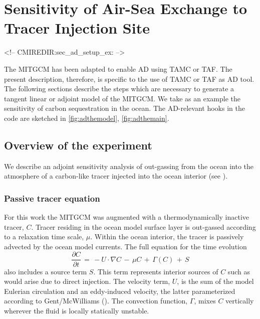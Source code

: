 
\section{Sensitivity of Air-Sea Exchange to Tracer Injection Site }
\label{www:tutorials}
\label{sect:eg-simple-tracer-adjoint}
\label{sec_ad_setup_ex}
\label{sect:tutorialIII}
\begin{rawhtml}
<!-- CMIREDIR:sec_ad_setup_ex: -->
\end{rawhtml}

The MITGCM has been adapted to enable AD using TAMC or TAF.
The present description, therefore, is specific to the
use of TAMC or TAF as AD tool.
The following sections describe the steps which are necessary to 
generate a tangent linear or adjoint model of the MITGCM.
We take as an example the sensitivity of carbon sequestration
in the ocean.
The AD-relevant hooks in the code are sketched in 
\ref{fig:adthemodel}, \ref{fig:adthemain}.

\subsection{Overview of the experiment}
\label{www:tutorials}

We describe an adjoint sensitivity analysis of out-gassing from 
the ocean into the atmosphere of a carbon-like tracer injected
into the ocean interior (see \cite{hil-eta:01}).

\subsubsection{Passive tracer equation}
\label{www:tutorials}

For this work the MITGCM was augmented with a thermodynamically 
inactive tracer, $C$. Tracer residing in the ocean 
model surface layer is out-gassed according to a relaxation time scale, 
$\mu$. Within the ocean interior, the tracer is passively advected 
by the ocean model currents. The full equation for the time evolution
%
\begin{equation}
\label{carbon_ddt}
\frac{\partial C}{\partial t} \, = \, 
-U\cdot \nabla C \, - \, \mu C \, + \, \Gamma(C) \,+ \, S
\end{equation}
%
also includes a source term $S$. This term 
represents interior sources of $C$ such as would arise due to
direct injection.
The velocity term, $U$, is the sum of the
model Eulerian circulation and an eddy-induced velocity, the latter
parameterized according to Gent/McWilliams 
(\cite{gen-mcw:90, gen-eta:95}).
The convection function, $\Gamma$, mixes $C$ vertically wherever the 
fluid is locally statically unstable. 

